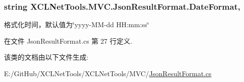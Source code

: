 \subsubsection[{\texorpdfstring{Date\+Format}{DateFormat}}]{\setlength{\rightskip}{0pt plus 5cm}string X\+C\+L\+Net\+Tools.\+M\+V\+C.\+Json\+Result\+Format.\+Date\+Format\hspace{0.3cm}{\ttfamily [get]}, {\ttfamily [set]}}\hypertarget{class_x_c_l_net_tools_1_1_m_v_c_1_1_json_result_format_afc01b7cf2cd3f17c481c25ad70fcd4f6}{}\label{class_x_c_l_net_tools_1_1_m_v_c_1_1_json_result_format_afc01b7cf2cd3f17c481c25ad70fcd4f6}


格式化时间，默认值为\char`\"{}yyyy-\/\+M\+M-\/dd H\+H\+:mm\+:ss\char`\"{} 



在文件 Json\+Result\+Format.\+cs 第 27 行定义.



该类的文档由以下文件生成\+:\begin{DoxyCompactItemize}
\item 
E\+:/\+Git\+Hub/\+X\+C\+L\+Net\+Tools/\+X\+C\+L\+Net\+Tools/\+M\+V\+C/\hyperlink{_json_result_format_8cs}{Json\+Result\+Format.\+cs}\end{DoxyCompactItemize}
